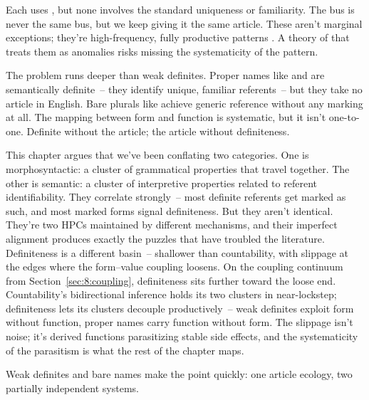 Each uses , but none involves the standard uniqueness or familiarity. The bus is never the same bus, but we keep giving it the same article. These aren't marginal exceptions; they're high-frequency, fully productive patterns \citep{carlsonsussman2005,poesio1994}. A theory of  that treats them as anomalies risks missing the systematicity of the pattern.

The problem runs deeper than weak definites. Proper names like  and  are semantically definite~-- they identify unique, familiar referents~-- but they take no article in English. Bare plurals like  achieve generic reference without any marking at all. The mapping between form and function is systematic, but it isn't one-to-one. Definite without the article; the article without definiteness.

This chapter argues that we've been conflating two categories. One is morphosyntactic: a cluster of grammatical properties that travel together. The other is semantic: a cluster of interpretive properties related to referent identifiability. They correlate strongly~-- most definite referents get marked as such, and most marked forms signal definiteness. But they aren't identical. They're two HPCs maintained by different mechanisms, and their imperfect alignment produces exactly the puzzles that have troubled the literature. Definiteness is a different basin~-- shallower than countability, with slippage at the edges where the form--value coupling loosens. On the coupling continuum from Section~\ref{sec:8:coupling}, definiteness sits further toward the loose end. Countability's bidirectional inference holds its two clusters in near-lockstep; definiteness lets its clusters decouple productively~-- weak definites exploit form without function, proper names carry function without form. The slippage isn't noise; it's derived functions parasitizing stable side effects, and the systematicity of the parasitism is what the rest of the chapter maps.

Weak definites and bare names make the point quickly: one article ecology, two partially independent systems.

